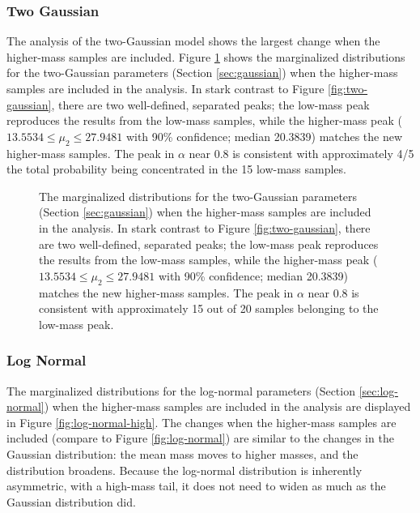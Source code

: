 \documentclass[preprint]{aastex}
\begin{document}
\subsubsection{Two Gaussian}

The analysis of the two-Gaussian model shows the largest change when
the higher-mass samples are included.  Figure
\ref{fig:two-gaussian-high} shows the marginalized distributions for
the two-Gaussian parameters (Section \ref{sec:gaussian}) when the
higher-mass samples are included in the analysis.  In stark contrast
to Figure \ref{fig:two-gaussian}, there are two well-defined,
separated peaks; the low-mass peak reproduces the results from the
low-mass samples, while the higher-mass peak ($13.5534 \leq \mu_2 \leq
27.9481$ with 90\% confidence; median 20.3839) matches the new
higher-mass samples.  The peak in $\alpha$ near 0.8 is consistent with
approximately 4/5 the total probability being concentrated in the 15
low-mass samples.

\begin{figure}
  \begin{center}
  \end{center}
  \caption{\label{fig:two-gaussian-high} The marginalized
    distributions for the two-Gaussian parameters (Section
    \ref{sec:gaussian}) when the higher-mass samples are included in
    the analysis.  In stark contrast to Figure \ref{fig:two-gaussian},
    there are two well-defined, separated peaks; the low-mass peak
    reproduces the results from the low-mass samples, while the
    higher-mass peak ($13.5534 \leq \mu_2 \leq 27.9481$ with 90\%
    confidence; median 20.3839) matches the new higher-mass samples.
    The peak in $\alpha$ near 0.8 is consistent with approximately 15
    out of 20 samples belonging to the low-mass peak.}
\end{figure}

\subsubsection{Log Normal}

The marginalized distributions for the log-normal parameters (Section
\ref{sec:log-normal}) when the higher-mass samples are included in the
analysis are displayed in Figure \ref{fig:log-normal-high}.  The
changes when the higher-mass samples are included (compare to Figure
\ref{fig:log-normal}) are similar to the changes in the Gaussian
distribution: the mean mass moves to higher masses, and the
distribution broadens.  Because the log-normal distribution is
inherently asymmetric, with a high-mass tail, it does not need to
widen as much as the Gaussian distribution did.
\end{document}
